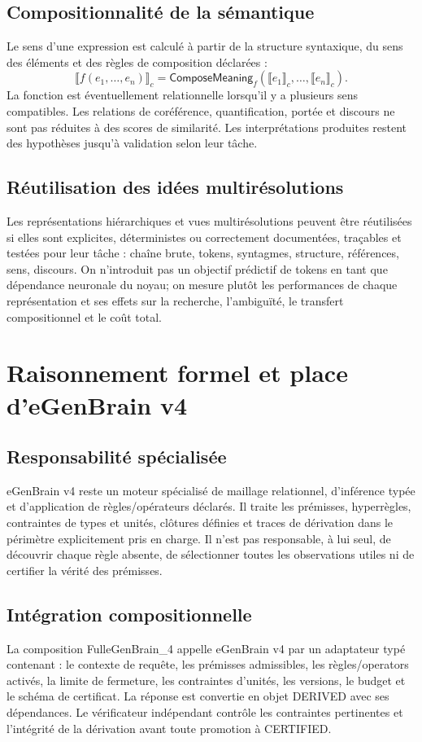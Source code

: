 \documentclass[11pt,a4paper]{article}
\newcommand{\State}[1]{\textsf{#1}}
\begin{document}
\subsection{Compositionnalité de la sémantique}
Le sens d'une expression est calculé à partir de la structure syntaxique, du sens des éléments et des règles de composition déclarées :
\[
\llbracket f(e_1,\ldots,e_n)\rrbracket_c = \mathsf{ComposeMeaning}_f(\llbracket e_1\rrbracket_c,\ldots,\llbracket e_n\rrbracket_c).
\]
La fonction est éventuellement relationnelle lorsqu'il y a plusieurs sens compatibles. Les relations de coréférence, quantification, portée et discours ne sont pas réduites à des scores de similarité. Les interprétations produites restent des hypothèses jusqu'à validation selon leur tâche.

\subsection{Réutilisation des idées multirésolutions}
Les représentations hiérarchiques et vues multirésolutions peuvent être réutilisées si elles sont explicites, déterministes ou correctement documentées, traçables et testées pour leur tâche : chaîne brute, tokens, syntagmes, structure, références, sens, discours. On n'introduit pas un objectif prédictif de tokens en tant que dépendance neuronale du noyau; on mesure plutôt les performances de chaque représentation et ses effets sur la recherche, l'ambiguïté, le transfert compositionnel et le coût total.

\section{Raisonnement formel et place d'eGenBrain v4}
\subsection{Responsabilité spécialisée}
eGenBrain v4 reste un moteur spécialisé de maillage relationnel, d'inférence typée et d'application de règles/opérateurs déclarés. Il traite les prémisses, hyperrègles, contraintes de types et unités, clôtures définies et traces de dérivation dans le périmètre explicitement pris en charge. Il n'est pas responsable, à lui seul, de découvrir chaque règle absente, de sélectionner toutes les observations utiles ni de certifier la vérité des prémisses.

\subsection{Intégration compositionnelle}
La composition FulleGenBrain\_4 appelle eGenBrain v4 par un adaptateur typé contenant : le contexte de requête, les prémisses admissibles, les règles/operators activés, la limite de fermeture, les contraintes d'unités, les versions, le budget et le schéma de certificat. La réponse est convertie en objet \State{DERIVED} avec ses dépendances. Le vérificateur indépendant contrôle les contraintes pertinentes et l'intégrité de la dérivation avant toute promotion à \State{CERTIFIED}.
\end{document}
